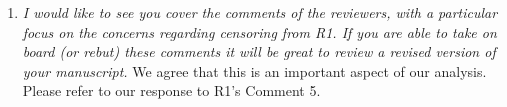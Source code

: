 \documentclass[letterpaper,12pt]{article}
\newcounter{b}
\newcommand{\Reply}[1]{\par\noindent\textbf{Reply:} #1}
\begin{document}
\begin{enumerate}
\Reply{We agree that, as currently worded, this passage reads as an inconsistency and thank the Associate Editor for flagging it. As this passage was meant to highlight existing literature concerned with information efficiency in sports betting and now yet about in-play or pre-game related questions, we decided to delete the sentence as it is not needed at this stage and we tried to observe the word limit.
}

\item \textit{I would like to see you cover the comments of the reviewers, with a particular focus on the concerns regarding censoring from R1. If you are able to take on board (or rebut) these comments it will be great to review a revised version of your manuscript. }
We agree that this is an important aspect of our analysis. Please refer to our response to R1's Comment 5.

\end{enumerate}
\end{document}
